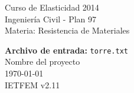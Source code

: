\documentclass[a4paper,11pt]{article}
\begin{document}
      

\pagestyle{fancy}                            
\cfoot{}                                     


\begin{minipage}[t]{1\textwidth}      
\vspace{0.5mm}      
\noindent      
Curso de Elasticidad 2014 \\     
Ingeniería Civil - Plan 97 \\      
Materia: Resistencia de Materiales      

\begin{center}      
\textbf{\Large{ Archivo de entrada:}}\Large{ \verb+torre.txt+}  \\      
\large{Nombre del proyecto\\}       
\today\\      
IETFEM v2.11      
\vspace{-2.9cm}      
\end{center}      
\end{minipage}      
\hspace{-2cm}      
\end{document}

